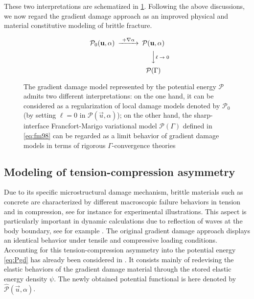 These two interpretations are schematized in \cref{fig:twointerpretationdamage}. Following the above discussions, we now regard the gradient damage approach as an improved physical and material constitutive modeling of brittle fracture.
\begin{figure}[htbp]
\centering
\[
\begin{CD}
\mathcal{P}_0(\vec{u},\alpha) @>\text{+$\nabla\alpha$}>> \mathcal{P}(\vec{u},\alpha) \\
@. @VV\text{$\ell\to 0$}V \\
@. \mathcal{P}(\Gamma)
\end{CD}
\]
\caption{The gradient damage model represented by the potential energy $\mathcal{P}$ admits two different interpretations: on the one hand, it can be considered as a regularization of local damage models denoted by $\mathcal{P}_0$ (by setting $\ell=0$ in $\mathcal{P}(\vec{u},\alpha)$); on the other hand, the sharp-interface Francfort-Marigo variational model $\mathcal{P}(\Gamma)$ defined in \eqref{eq:fm98} can be regarded as a limit behavior of gradient damage models in terms of rigorous $\Gamma$-convergence theories \cite{Braides:2002}} \label{fig:twointerpretationdamage}
\end{figure}

\subsection{Modeling of tension-compression asymmetry} \label{sec:tcmodeling}
Due to its specific microstructural damage mechanism, brittle materials such as concrete are characterized by different macroscopic failure behaviors in tension and in compression, see for instance \cite{KupferGerstle:1973,LeeSongH:2004} for experimental illustrations. This aspect is particularly important in dynamic calculations due to reflection of waves at the body boundary, see for example \cite{MoreauMoesPicartStainier:2015}. The original gradient damage approach displays an identical behavior under tensile and compressive loading conditions. Accounting for this tension-compression asymmetry into the potential energy \eqref{eq:Pgd} has already been considered in \cite{PieroLancioniMarch:2007,AmorMarigoMaurini:2009,FreddiRoyer-Carfagni:2010}. It consists mainly of redevising the elastic behaviors of the gradient damage material through the stored elastic energy density $\psi$. The newly obtained potential functional is here denoted by $\widehat{\mathcal{P}}(\vec{u},\alpha)$.

